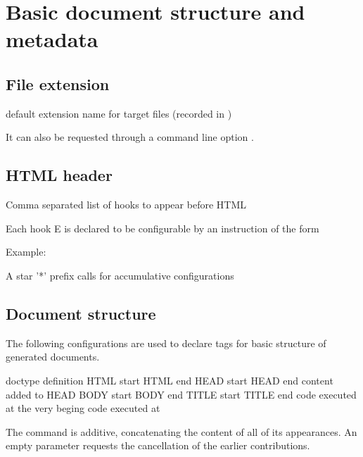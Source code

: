 \section{Basic document structure and metadata}
\label{sec:document_structure}

\subsection{File extension}

 {default extension name for target files  (recorded in )}\EndDoc

It can also be requested through a command line option .

\subsection{HTML header}
 {Comma separated list of hooks to appear before HTML}\EndDoc

Each hook E is declared to be configurable by an instruction of the form 


Example:

\begin{texsource}
\end{texsource}

A star '*' prefix calls for accumulative configurations

\subsection{Document structure}

The following configurations are used to declare tags for basic structure of generated documents.


 {doctype definition}\EndDoc
{} {HTML start} {HTML end}\EndDoc
{} {HEAD start} {HEAD end}\EndDoc
{} {content added to HEAD}\EndDoc
{} {BODY start} {BODY end}\EndDoc
{} {TITLE start} {TITLE end}\EndDoc
{} {code executed at the very beging} {code executed at }\EndDoc




The  command is additive, concatenating the
content of all of its appearances.  An empty parameter requests
the cancellation of the earlier contributions.

